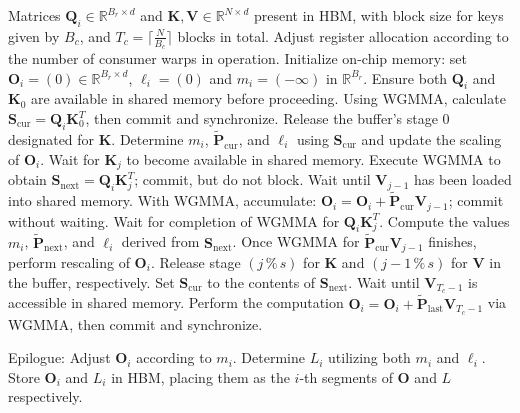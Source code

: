 \begin{algorithm}[H]
    \caption{\small\label{alg:flash3_wgmma}\textsc{FlashAttention-3} consumer warpgroup forward pass}
    \begin{algorithmic}[1]
      \REQUIRE  Matrices $\mathbf{Q}_i \in \mathbb{R}^{B_r \times d}$ and $\mathbf{K}, \mathbf{V} \in \mathbb{R}^{N \times d}$ present in HBM, with block size for keys given by $B_c$, and $T_c = \lceil \frac{N}{B_c} \rceil$ blocks in total.
      \STATE Adjust register allocation according to the number of consumer warps in operation.
      \STATE Initialize on-chip memory: set $\mathbf{O}_i = (0) \in \mathbb{R}^{B_r \times d}$, $\ell_i = (0)$ and $m_i = (-\infty)$ in $\mathbb{R}^{B_r}$.
      \STATE Ensure both $\mathbf{Q}_i$ and $\mathbf{K}_0$ are available in shared memory before proceeding.
      \STATE Using WGMMA, calculate $\mathbf{S}_{\mathrm{cur}} = \mathbf{Q}_i \mathbf{K}_0^T$, then commit and synchronize.
      \STATE Release the buffer's stage $0$ designated for $\mathbf{K}$.
      \STATE Determine $m_{i}$, $\tilde{\mathbf{P}}_{\mathrm{cur}}$, and $\ell_{i}$ using $\mathbf{S}_{\mathrm{cur}}$ and update the scaling of $\mathbf{O}_i$.
        \STATE Wait for $\mathbf{K}_j$ to become available in shared memory.
        \label{code:mainloop_start}
        \STATE Execute WGMMA to obtain $\mathbf{S}_{\mathrm{next}} = \mathbf{Q}_i \mathbf{K}_{j}^T$; commit, but do not block.
        \label{code:first_wgmma}
        \STATE Wait until $\mathbf{V}_{j-1}$ has been loaded into shared memory.
        \STATE With WGMMA, accumulate: $\mathbf{O}_{i} = \mathbf{O}_{i} + \tilde{\mathbf{P}}_{\mathrm{cur}} \mathbf{V}_{j-1}$; commit without waiting.
        \label{code:second_wgmma}
        \STATE Wait for completion of WGMMA for $\mathbf{Q}_i \mathbf{K}_{j}^T$.
        \STATE Compute the values $m_{i}$, $\tilde{\mathbf{P}}_{\mathrm{next}}$, and $\ell_{i}$ derived from $\mathbf{S}_{\mathrm{next}}$.
        \label{code:softmax}
        \STATE Once WGMMA for $\tilde{\mathbf{P}}_{\mathrm{cur}} \mathbf{V}_{j-1}$ finishes, perform rescaling of $\mathbf{O}_i$.
        \STATE Release stage $(j\,\%\,s)$ for $\mathbf{K}$ and $(j-1\,\%\,s)$ for $\mathbf{V}$ in the buffer, respectively.
        \STATE Set $\mathbf{S}_{\mathrm{cur}}$ to the contents of $\mathbf{S}_{\mathrm{next}}$.
        \label{code:mainloop_end}
      \ENDFOR \STATE Wait until $\mathbf{V}_{T_c - 1}$ is accessible in shared memory.
      \STATE Perform the computation $\mathbf{O}_{i} = \mathbf{O}_{i} + \tilde{\mathbf{P}}_{\mathrm{last}} \mathbf{V}_{T_c - 1}$ via WGMMA, then commit and synchronize.

\STATE Epilogue: Adjust $\mathbf{O}_{i}$ according to $m_{i}$. Determine $L_{i}$ utilizing both $m_{i}$ and $\ell_{i}$.
Store $\mathbf{O}_{i}$ and $L_{i}$ in HBM, placing them as the $i$-th segments of $\mathbf{O}$ and $L$ respectively.
\end{algorithmic}
\end{algorithm}

